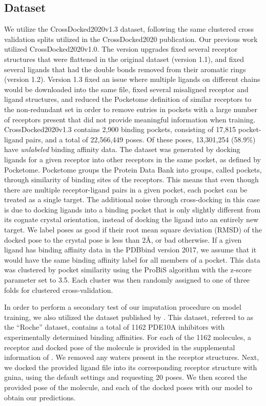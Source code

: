 \documentclass[journal=jcim,manuscript=article]{achemso}
\begin{document}
\subsection{Dataset}
We utilize the CrossDocked2020v1.3 dataset, following the same clustered cross validation splits utilized in the CrossDocked2020 publication.\cite{crossdocked2020}
Our previous work utilized CrossDocked2020v1.0\cite{crossdocked2020}.
The version upgrades fixed several receptor structures that were flattened in the original dataset (version 1.1), and fixed several ligands that had the double bonds removed from their aromatic rings (version 1.2).
Version 1.3 fixed an issue where multiple ligands on different chains would be downloaded into the same file, fixed several misaligned receptor and ligand structures, and reduced the Pocketome definition of similar receptors to the non-redundant set in order to remove entries in pockets with a large number of receptors present that did not provide meaningful information when training.
CrossDocked2020v1.3 contains 2,900 binding pockets, consisting of 17,815 pocket-ligand pairs, and a total of 22,566,449 poses.
Of these poses, 13,301,254 (58.9\%) have \emph{unlabeled} binding affinity data.
The dataset was generated by docking ligands for a given receptor into other receptors in the same pocket, as defined by Pocketome\cite{pocketome}.
Pocketome groups the Protein Data Bank into groups, called pockets, through similarity of binding sites of the receptors.
This means that even though there are multiple receptor-ligand pairs in a given pocket, each pocket can be treated as a single target.
The additional noise through cross-docking in this case is due to docking ligands into a binding pocket that is only slightly different from its cognate crystal orientation, instead of docking the ligand into an entirely new target.
We label poses as good if their root mean square deviation (RMSD) of the docked pose to the crystal pose is less than 2{\AA}, or bad otherwise.
If a given ligand has binding affinity data in the PDBbind version 2017, we assume that it would have the same binding affinity label for all members of a pocket.
This data was clustered by pocket similarity using the ProBiS \cite{ProBiS} algorithm with the z-score parameter set to 3.5.
Each cluster was then randomly assigned to one of three folds for clustered cross-validation.

In order to perform a secondary test of our imputation procedure on model training, we also utilized the dataset published by \citet{tosstorff2022high}.
This dataset, referred to as the ``Roche'' dataset, contains a total of 1162 PDE10A inhibitors with experimentally determined binding affinities.
For each of the 1162 molecules, a receptor and docked pose of the molecule is provided in the supplemental information of \citet{tosstorff2022high}.
We removed any waters present in the receptor structures.
Next, we docked the provided ligand file into its corresponding receptor structure with gnina, using the default settings and requesting 20 poses.
We then scored the provided pose of the molecule, and each of the docked poses with our model to obtain our predictions.
\end{document}
